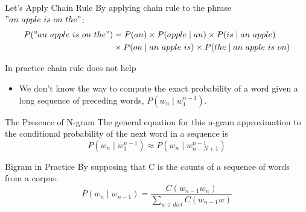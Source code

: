 \documentclass{beamer}
\begin{document}
\begin{frame}{Let's Apply Chain Rule}
    By applying chain rule to the phrase $"an\ apple\ is\ on\ the"$:
    \begin{align*}
        P("an\ apple\ is\ on\ the") &= P(an)\times P(apple\mid an) \times P(is\mid an\ apple)\\
                                  &\times P(on\mid an\ apple\ is) \times P(the\mid an\ apple\ is\ on) 
    \end{align*}
\end{frame}

\begin{frame}{In practice chain rule does not help}
    \begin{itemize}[<+->]
        \item We don't know the way to compute the exact probability of a word given a long sequence of preceding words, $P(w_n\mid w_1^{n-1})$.
    \end{itemize}

\end{frame}

\begin{frame}{The Presence of N-gram}
    The general equation for this n-gram approximation to the conditional probability of the next word in a sequence is
    $$P(w_n\mid w_1^{n-1}) \approx P(w_n\mid w_{n-N+1}^{n-1})$$


\end{frame}


\begin{frame}{Bigram in Practice}
By supposing that C is the counts of a sequence of words from a corpus.
    $$P(w_n\mid w_{n-1}) = \frac{C(w_{n-1}w_n)}{\sum_{w\in dict}C(w_{n-1}w)}$$


\end{frame}
\end{document}
